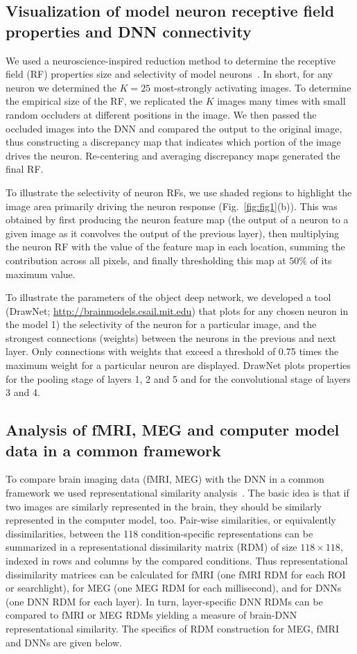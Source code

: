 \documentclass[10pt,twocolumn,letterpaper]{article}
\begin{document}
\subsection{Visualization of model neuron receptive field properties and DNN connectivity}
We used a neuroscience-inspired reduction method to determine the receptive field (RF) properties size and selectivity of model neurons~\cite{scenecnn_iclr15}. In short, for any neuron we determined the $K = 25$ most-strongly activating images. To determine the empirical size of the RF, we replicated the $K$ images many times with small random occluders at different positions in the image. We then passed the occluded images into the DNN and compared the output to the original image, thus constructing a discrepancy map that indicates which portion of the image drives the neuron. Re-centering and averaging discrepancy maps generated the final RF.

To illustrate the selectivity of neuron RFs, we use shaded regions to highlight the image area primarily driving the neuron response (Fig.~\ref{fig:fig1}(b)). This was obtained by first producing the neuron feature map (the output of a neuron to a given image as it convolves the output of the previous layer), then multiplying the neuron RF with the value of the feature map in each location, summing the contribution across all pixels, and finally thresholding this map at $50\%$ of its maximum value.

To illustrate the parameters of the object deep network, we developed a tool (DrawNet; \href{http://brainmodels.csail.mit.edu}{http://brainmodels.csail.mit.edu}) that plots for any chosen neuron in the model 1) the selectivity of the neuron for a particular image, and the strongest connections (weights) between the neurons in the previous and next layer. Only connections with weights that exceed a threshold of 0.75 times the maximum weight for a particular neuron are displayed. DrawNet plots properties for the pooling stage of layers 1, 2 and 5 and for the convolutional stage of layers 3 and 4.

\subsection{Analysis of fMRI, MEG and computer model data in a common framework}
To compare brain imaging data (fMRI, MEG) with the DNN in a common framework we used representational similarity analysis~\cite{khaligh2014deep,kriegeskorte2008representational}. The basic idea is that if two images are similarly represented in the brain, they should be similarly represented in the computer model, too. Pair-wise similarities, or equivalently dissimilarities, between the 118 condition-specific representations can be summarized in a representational dissimilarity matrix (RDM) of size $118\times118$, indexed in rows and columns by the compared conditions. Thus representational dissimilarity matrices can be calculated for fMRI (one fMRI RDM for each ROI or searchlight), for MEG (one MEG RDM for each millisecond), and for DNNs (one DNN RDM for each layer). In turn, layer-specific DNN RDMs can be compared to fMRI or MEG RDMs yielding a measure of brain-DNN representational similarity. The specifics of RDM construction for MEG, fMRI and DNNs are given below.
\end{document}

